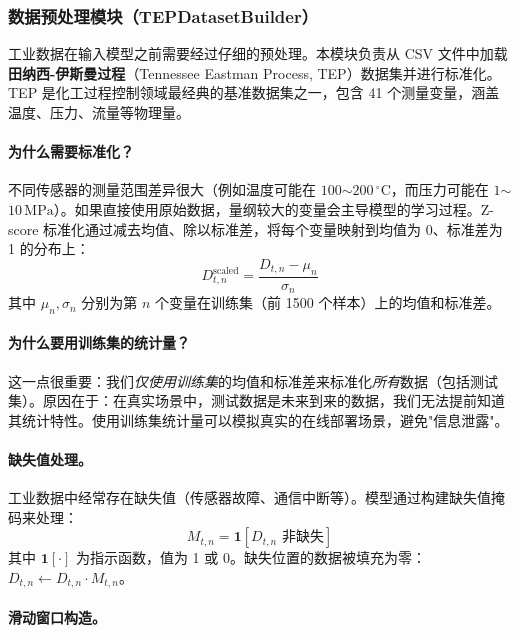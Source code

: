 \documentclass[UTF8]{ctexart}
\begin{document}
\subsubsection{数据预处理模块（TEPDatasetBuilder）}

工业数据在输入模型之前需要经过仔细的预处理。本模块负责从 CSV 文件中加载\textbf{田纳西-伊斯曼过程}（Tennessee Eastman Process, TEP）数据集并进行标准化。TEP 是化工过程控制领域最经典的基准数据集之一，包含 41 个测量变量，涵盖温度、压力、流量等物理量。

\paragraph{为什么需要标准化？}

不同传感器的测量范围差异很大（例如温度可能在 $100$$\sim$$200\,{}^{\circ}\mathrm{C}$，而压力可能在 $1$$\sim$$10\,\mathrm{MPa}$）。如果直接使用原始数据，量纲较大的变量会主导模型的学习过程。Z-score 标准化通过减去均值、除以标准差，将每个变量映射到均值为 0、标准差为 1 的分布上：
\begin{equation}
    D_{t,n}^{\text{scaled}} = \frac{D_{t,n} - \mu_n}{\sigma_n}
\end{equation}
其中 $\mu_n, \sigma_n$ 分别为第 $n$ 个变量在训练集（前 1500 个样本）上的均值和标准差。

\paragraph{为什么要用训练集的统计量？}

这一点很重要：我们\emph{仅使用训练集}的均值和标准差来标准化\emph{所有}数据（包括测试集）。原因在于：在真实场景中，测试数据是未来到来的数据，我们无法提前知道其统计特性。使用训练集统计量可以模拟真实的在线部署场景，避免"信息泄露"。

\paragraph{缺失值处理。}

工业数据中经常存在缺失值（传感器故障、通信中断等）。模型通过构建缺失值掩码来处理：
\begin{equation}
    M_{t,n} = \mathbf{1}[D_{t,n} \text{ 非缺失}]
\end{equation}
其中 $\mathbf{1}[\cdot]$ 为指示函数，值为 1 或 0。缺失位置的数据被填充为零：$D_{t,n} \leftarrow D_{t,n} \cdot M_{t,n}$。

\paragraph{滑动窗口构造。}
\end{document}
